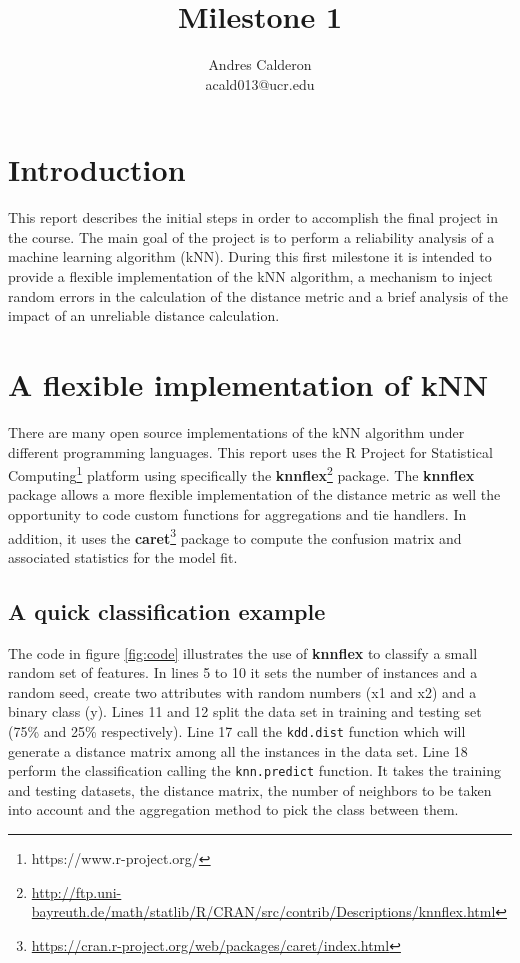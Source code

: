 \documentclass{article}\usepackage[]{graphicx}\usepackage[]{color}
\title{Milestone 1}
\author{Andres Calderon \\ acald013@ucr.edu}
\begin{document}
\maketitle

\section{Introduction}
This report describes the initial steps in order to accomplish the final project in the course. The main goal of the project is to perform a reliability analysis of a machine learning algorithm (kNN).  During this first milestone it is intended to provide a flexible implementation of the kNN algorithm, a mechanism to inject random errors in the calculation of the distance metric and a brief analysis of the impact of an unreliable distance calculation.

\section{A flexible implementation of kNN}
There are many open source implementations of the kNN algorithm under different programming languages.  This report uses the R Project for Statistical Computing\footnote{https://www.r-project.org/} platform using specifically the \textbf{knnflex}\footnote{\url{http://ftp.uni-bayreuth.de/math/statlib/R/CRAN/src/contrib/Descriptions/knnflex.html}} package. The \textbf{knnflex} package allows a more flexible implementation of the distance metric as well the opportunity to code custom functions for aggregations and tie handlers.  In addition, it uses the \textbf{caret}\footnote{\url{https://cran.r-project.org/web/packages/caret/index.html}} package to compute the confusion matrix and associated statistics for the model fit.

\subsection{A quick classification example}
The code in figure \ref{fig:code} illustrates the use of \textbf{knnflex} to classify a small random set of features.  In lines 5 to 10 it sets the number of instances and a random seed, create two attributes with random numbers (x1 and x2) and a binary class (y).  Lines 11 and 12 split the data set in training and testing set (75\% and 25\% respectively). Line 17 call the \texttt{kdd.dist} function which will generate a distance matrix among all the instances in the data set. Line 18 perform the classification calling the \texttt{knn.predict} function.  It takes the training and testing datasets, the distance matrix, the number of neighbors to be taken into account and the aggregation method to pick the class between them.  
\end{document}
